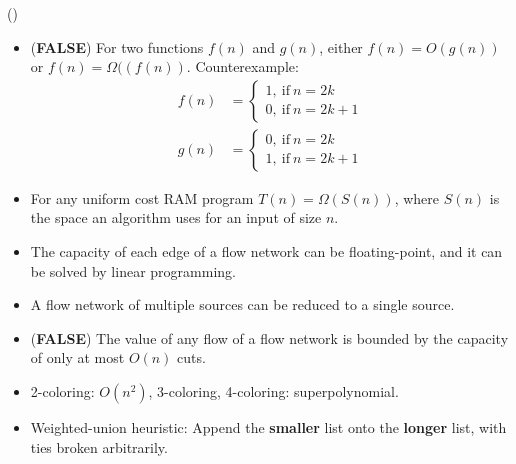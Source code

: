 \item \begin{theorem}{()} \quad\quad
    \begin{itemize}
        \item (\textbf{FALSE}) For two functions $f(n)$ and $g(n)$, either $f(n) = O(g(n))$ or $f(n) = \Omega((f(n))$.
        Counterexample:\begin{equation}
            \begin{aligned}
                f(n) & = \begin{cases}
                    1, \ \text{if} \ n = 2k \\
                    0, \ \text{if} \ n = 2k + 1
                \end{cases} \\
                g(n) & = \begin{cases}
                    0, \ \text{if} \ n = 2k \\
                    1, \ \text{if} \ n = 2k + 1
                \end{cases} 
            \end{aligned}
        \end{equation}
        \item For any uniform cost RAM program $T(n) = \Omega(S(n))$, where $S(n)$ is the space an algorithm uses for an input of size $n$.
        \item The capacity of each edge of a flow network can be floating-point, and it can be solved by linear programming.
        \item A flow network of multiple sources can be reduced to a single source.
        \item (\textbf{FALSE}) The value of any flow of a flow network is bounded by the capacity of only at most $O(n)$ cuts.
        \item 2-coloring: $O(n^2)$, 3-coloring, 4-coloring: superpolynomial.
        \item Weighted-union heuristic: Append the \textbf{smaller} list onto the \textbf{longer} list, with ties broken arbitrarily.
    \end{itemize}
\end{theorem}
